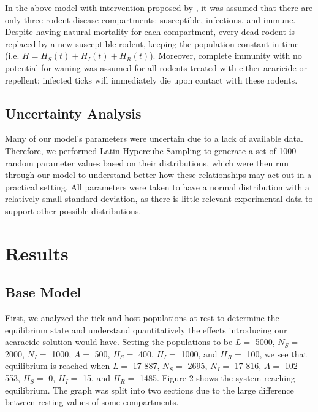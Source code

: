 \documentclass[12pt, centerh1]{article}
\begin{document}
In the above model with intervention proposed by \cite{tosato2021host}, it was assumed that there are only three rodent disease compartments: susceptible, infectious, and immune. Despite having natural mortality for each compartment, every dead rodent is replaced by a new susceptible rodent, keeping the population constant in time (i.e. $H = H_S(t) + H_I(t) + H_R(t)$). Moreover, complete immunity with no potential for waning was assumed for all rodents treated with either acaricide or repellent; infected ticks will immediately die upon contact with these rodents.


\subsection{Uncertainty Analysis}
Many of our model's parameters were uncertain due to a lack of available data. Therefore, we performed Latin Hypercube Sampling to generate a set of 1000 random parameter values based on their distributions, which were then run through our model to understand better how these relationships may act out in a practical setting. All parameters were taken to have a normal distribution with a relatively small standard deviation, as there is little relevant experimental data to support other possible distributions. 


\section{Results}

\subsection{Base Model}
First, we analyzed the tick and host populations at rest to determine the equilibrium state and understand quantitatively the effects introducing our acaracide solution would have. Setting the populations to be $L=$ 5000, $N_S=$ 2000, $N_I=$ 1000, $A=$ 500, $H_S=$ 400, $H_I=$ 1000, and $H_R=$ 100, we see that equilibrium is reached when $L=$ 17 887, $N_S=$ 2695, $N_I=$ 17 816, $A=$ 102 553, $H_S=$ 0, $H_I=$ 15, and $H_R=$ 1485. Figure 2 shows the system reaching equilibrium. The graph was split into two sections due to the large difference between resting values of some compartments.
\end{document}
